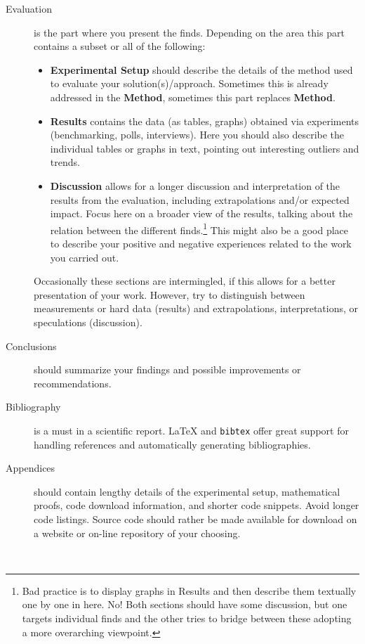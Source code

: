 \documentclass[nofilelist]{cslthse-msc}
\begin{document}
\begin{appendices}
\begin{description}
\begin{itemize}
\end{itemize}
\item[Evaluation] is the part where you present the finds. Depending on the area this part contains a subset or all of the following: 
\begin{itemize}
\item \textbf{Experimental Setup} should describe the details of the method used to evaluate your solution(s)/approach. Sometimes this is already addressed in the \textbf{Method}, sometimes this part replaces \textbf{Method}.
\item \textbf{Results} contains the data (as tables, graphs) obtained via experiments  (benchmarking, polls, interviews). Here you should also describe the individual tables or graphs in text, pointing out interesting outliers and trends.
\item \textbf{Discussion} allows for a longer discussion and interpretation of the results from the evaluation, including extrapolations and/or expected impact. Focus here on a broader view of the results, talking about the relation between the different finds.\footnote{Bad practice is to display graphs in Results and then describe them textually one by one in here. No! Both sections should have some discussion, but one targets individual finds and the other tries to bridge between these adopting a more overarching viewpoint.} This might also be a good place to describe your positive and negative experiences related to the work you carried out.
\end{itemize} 
Occasionally these sections are intermingled, if this allows for a better presentation of your work. However, try to distinguish between measurements or hard data (results) and extrapolations, interpretations, or speculations (discussion).
\item[Conclusions] should summarize your findings and possible improvements or recommendations.
\item[Bibliography] is a must in a scientific report. {\LaTeX} and \texttt{bibtex} offer great support for  handling references and automatically generating bibliographies.
\item[Appendices] should contain lengthy details of the experimental setup, mathematical proofs, code download information, and shorter code snippets. Avoid longer code listings. Source code should rather be made available for download on a website or on-line repository of your choosing.

\end{description}


\printfilelist

\checkoddpage
\ifoddpage
\else
   \newpage
   \thispagestyle{empty}
   \mbox{ }
\fi

\end{appendices}
\end{document}
